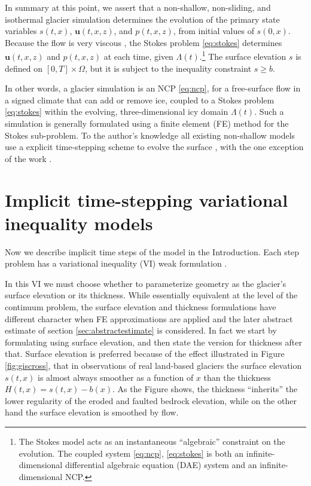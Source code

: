 \documentclass[hidelinks,onefignum,onetabnum,final]{siamart220329}  %
\newcommand{\bu}{\mathbf{u}}
\begin{document}
In summary at this point, we assert that a non-shallow, non-sliding, and isothermal glacier simulation determines the evolution of the primary state variables $s(t,x)$, $\bu(t,x,z)$, and $p(t,x,z)$, from initial values of $s(0,x)$.  Because the flow is very viscous \cite{Acheson1990}, the Stokes problem \eqref{eq:stokes} determines $\bu(t,x,z)$ and $p(t,x,z)$ at each time, given $\Lambda(t)$.\footnote{The Stokes model acts as an instantaneous ``algebraic'' constraint on the evolution.  The coupled system \eqref{eq:ncp}, \eqref{eq:stokes} is both an infinite-dimensional differential algebraic equation (DAE) system and an infinite-dimensional NCP.}  The surface elevation $s$ is defined on $[0,T]\times \Omega$, but it is subject to the inequality constraint $s\ge b$.

In other words, a glacier simulation is an NCP \eqref{eq:ncp}, for a free-surface flow in a signed climate that can add or remove ice, coupled to a Stokes problem \eqref{eq:stokes} within the evolving, three-dimensional icy domain $\Lambda(t)$.  Such a simulation is generally formulated using a finite element (FE) method for the Stokes sub-problem.  To the author's knowledge all existing non-shallow models use a explicit time-stepping scheme to evolve the surface \cite[for example]{Jouvetetal2008}, with the one exception of the work \cite{WirbelJarosch2020}.  


\section{Implicit time-stepping variational inequality models} \label{sec:models}

Now we describe implicit time steps of the model in the Introduction.  Each step problem has a variational inequality (VI) weak formulation \cite{Evans2010,KinderlehrerStampacchia1980}.

In this VI we must choose whether to parameterize geometry as the glacier's surface elevation or its thickness.  While essentially equivalent at the level of the continuum problem, the surface elevation and thickness formulations have different character when FE approximations are applied and the later abstract estimate of section \ref{sec:abstractestimate} is considered.  In fact we start by formulating using surface elevation, and then state the version for thickness after that.  Surface elevation is preferred because of the effect illustrated in Figure \ref{fig:giscross}, that in observations of real land-based glaciers the surface elevation $s(t,x)$ is almost always smoother as a function of $x$ than the thickness $H(t,x) = s(t,x)-b(x)$.  As the Figure shows, the thickness ``inherits'' the lower regularity of the eroded and faulted bedrock elevation, while on the other hand the surface elevation is smoothed by flow.
\end{document}
